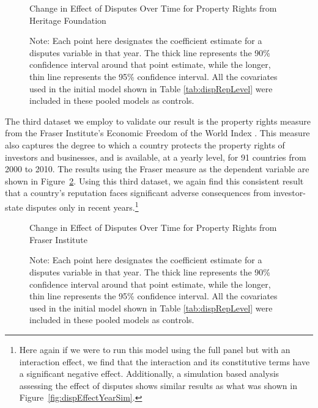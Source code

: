 \documentclass[12pt,onesided]{amsart}
\begin{document}
\begin{figure}[ht]
	\centering
	\caption{Change in Effect of Disputes Over Time for Property Rights from Heritage Foundation}
	\label{fig:dispEffectYear_herit}
	\resizebox{1\textwidth}{!}{}
	\caption*{Note: Each point here designates the coefficient estimate for a disputes variable in that year. The thick line represents the 90\% confidence interval around that point estimate, while the longer, thin line represents the 95\% confidence interval. All the covariates used in the initial model shown in Table \ref{tab:dispRepLevel} were included in these pooled models as controls.}
\end{figure}
\FloatBarrier

The third dataset we employ to validate our result is the property rights measure from the Fraser Institute's Economic Freedom of the World Index \citep{gwartney:lawson:2004}. This measure also captures the degree to which a country protects the property rights of investors and businesses, and is available, at a yearly level, for 91 countries from 2000 to 2010. The results using the Fraser measure as the dependent variable are shown in Figure~\ref{fig:dispEffectYear_fraser}. Using this third dataset, we again find this consistent result that a country's reputation faces significant adverse consequences from investor-state disputes only in recent years.\footnote{Here again if we were to run this model using the full panel but with an interaction effect, we find that the interaction and its constitutive terms have a significant negative effect. Additionally, a simulation based analysis assessing the effect of disputes shows similar results as what was shown in Figure~\ref{fig:dispEffectYearSim}.} 

\begin{figure}[ht]
	\centering
	\caption{Change in Effect of Disputes Over Time for Property Rights from Fraser Institute}
	\label{fig:dispEffectYear_fraser}
	\resizebox{1\textwidth}{!}{}
	\caption*{Note: Each point here designates the coefficient estimate for a disputes variable in that year. The thick line represents the 90\% confidence interval around that point estimate, while the longer, thin line represents the 95\% confidence interval. All the covariates used in the initial model shown in Table \ref{tab:dispRepLevel} were included in these pooled models as controls.}
\end{figure}
\FloatBarrier

\end{document}
